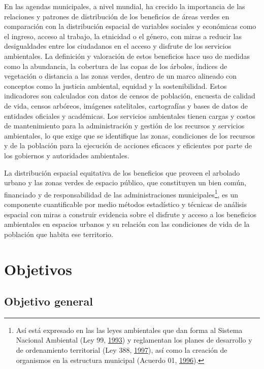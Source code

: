 \documentclass[12pt,a4paper,oneside, openany]{book}
\let\rmarkdownfootnote\footnote%
\def\footnote{\protect\rmarkdownfootnote}
\theoremstyle{definition}
\theoremstyle{definition}
\theoremstyle{definition}
\theoremstyle{remark}
\begin{document}
En las agendas municipales, a nivel mundial, ha crecido la importancia
de las relaciones y patrones de distribución de los beneficios de áreas
verdes en comparación con la distribución espacial de variables sociales
y económicas como el ingreso, acceso al trabajo, la etnicidad o el
género, con miras a reducir las desigualdades entre los ciudadanos en el
acceso y disfrute de los servicios ambientales. La definición y
valoración de estos beneficios hace uso de medidas como la abundancia,
la cobertura de las copas de los árboles, índices de vegetación o
distancia a las zonas verdes, dentro de un marco alineado con conceptos
como la justicia ambiental, equidad y la sostenibilidad. Estos
indicadores son calculados con datos de censos de población, encuesta de
calidad de vida, censos arbóreos, imágenes satelitales, cartografías y
bases de datos de entidades oficiales y académicas. Los servicios
ambientales tienen cargas y costos de mantenimiento para la
administración y gestión de los recursos y servicios ambientales, lo que
exige que se identifique las zonas, condiciones de los recursos y de la
población para la ejecución de acciones eficaces y eficientes por parte
de los gobiernos y autoridades ambientales.

La distribución espacial equitativa de los beneficios que proveen el
arbolado urbano y las zonas verdes de espacio público, que constituyen
un bien común, financiado y de responsabilidad de las administraciones
municipales\footnote{Así está expresado en las las leyes ambientales que
  dan forma al Sistema Nacional Ambiental (Ley 99,
  \protect\hyperlink{ref-ley99col}{1993}) y reglamentan los planes de
  desarrollo y de ordenamiento territorial (Ley 388,
  \protect\hyperlink{ref-ley388col}{1997}), así como la creación de
  organismos en la estructura municipal (Acuerdo 01,
  \protect\hyperlink{ref-cc_acuerdo01_1996}{1996}).}, es un componente
cuantificable por medio métodos estadístico y técnicas de análisis
espacial con miras a construir evidencia sobre el disfrute y acceso a
los beneficios ambientales en espacios urbanos y su relación con las
condiciones de vida de la población que habita ese territorio.

\section{Objetivos}\label{objetivos}

\subsection{Objetivo general}\label{objetivo-general}
\end{document}
